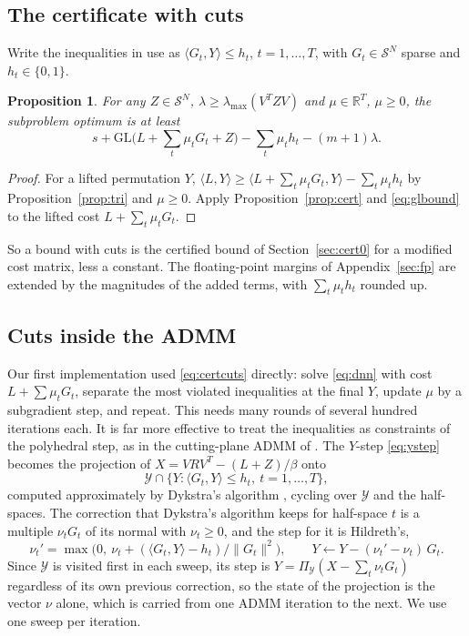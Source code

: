 \documentclass[11pt]{article}
\newtheorem{proposition}{Proposition}
\theoremstyle{remark}
\newcommand{\R}{\mathbb{R}}
\newcommand{\Sym}{\mathcal{S}}
\newcommand{\inner}[2]{\langle #1, #2\rangle}
\newcommand{\lmax}{\lambda_{\max}}
\newcommand{\GL}{\mathrm{GL}}
\begin{document}
\subsection{The certificate with cuts}\label{sec:certcuts}

Write the inequalities in use as $\inner{G_t}{Y}\le h_t$, $t = 1,\dots,T$, with
$G_t\in\Sym^N$ sparse and $h_t\in\{0,1\}$.

\begin{proposition}\label{prop:certcuts}
For any $Z\in\Sym^N$, $\lambda\ge\lmax(V^TZV)$ and $\mu\in\R^T$, $\mu\ge0$, the
subproblem optimum is at least
\begin{equation}\label{eq:certcuts}
  s + \GL\Big(L + \sum_t\mu_tG_t + Z\Big) - \sum_t \mu_th_t - (m+1)\lambda .
\end{equation}
\end{proposition}
\begin{proof}
For a lifted permutation $Y$, $\inner{L}{Y}\ge\inner{L+\sum_t\mu_tG_t}{Y} -
\sum_t\mu_th_t$ by Proposition~\ref{prop:tri} and $\mu\ge0$. Apply
Proposition~\ref{prop:cert} and \eqref{eq:glbound} to the lifted cost
$L + \sum_t\mu_tG_t$.
\end{proof}

So a bound with cuts is the certified bound of Section~\ref{sec:cert0} for a
modified cost matrix, less a constant. The floating-point margins of
Appendix~\ref{sec:fp} are extended by the magnitudes of the added terms, with
$\sum_t\mu_th_t$ rounded up.

\subsection{Cuts inside the ADMM}\label{sec:cpadmm}

Our first implementation used \eqref{eq:certcuts} directly: solve \eqref{eq:dnn}
with cost $L + \sum\mu_tG_t$, separate the most violated inequalities at the final
$Y$, update $\mu$ by a subgradient step, and repeat. This needs many rounds of
several hundred iterations each. It is far more effective to treat the
inequalities as constraints of the polyhedral step, as in the cutting-plane ADMM
of \cite{dmswz}. The $Y$-step \eqref{eq:ystep} becomes the projection of
$X = VRV^T - (L+Z)/\beta$ onto
\[
  \mathcal{Y}\cap\{Y : \inner{G_t}{Y}\le h_t,\ t = 1,\dots,T\},
\]
computed approximately by Dykstra's algorithm \cite{dykstra}, cycling over
$\mathcal{Y}$ and the half-spaces. The correction that Dykstra's algorithm keeps
for half-space $t$ is a multiple $\nu_tG_t$ of its normal with $\nu_t\ge0$, and
the step for it is Hildreth's,
\[
  \nu_t' = \max\big(0,\ \nu_t + (\inner{G_t}{Y} - h_t)/\|G_t\|^2\big),\qquad
  Y \leftarrow Y - (\nu_t'-\nu_t)\,G_t .
\]
Since $\mathcal{Y}$ is visited first in each sweep, its step is
$Y = \Pi_{\mathcal{Y}}(X - \sum_t\nu_tG_t)$ regardless of its own previous
correction, so the state of the projection is the vector $\nu$ alone, which is
carried from one ADMM iteration to the next. We use one sweep per iteration.
\end{document}
